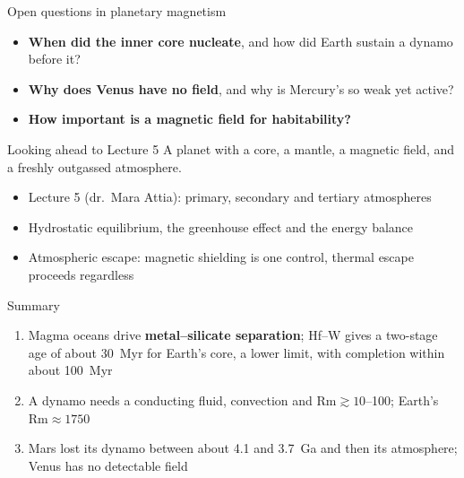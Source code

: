 \documentclass[aspectratio=169, 11pt]{beamer}
\begin{document}
\begin{frame}{Open questions in planetary magnetism}
  \begin{itemize}\setlength\itemsep{4pt}
    \item \textbf{When did the inner core nucleate}, and how did Earth sustain a dynamo before it?
    \item \textbf{Why does Venus have no field}, and why is Mercury's so weak yet active?
    \item \textbf{How important is a magnetic field for habitability?}
  \end{itemize}
\end{frame}

\begin{frame}{Looking ahead to Lecture 5}
  A planet with a core, a mantle, a magnetic field, and a freshly outgassed atmosphere.
  \vskip8pt
  \begin{itemize}\setlength\itemsep{3pt}
    \item Lecture 5 (dr.\ Mara Attia): primary, secondary and tertiary atmospheres
    \item Hydrostatic equilibrium, the greenhouse effect and the energy balance
    \item Atmospheric escape: magnetic shielding is one control, thermal escape proceeds regardless
  \end{itemize}
  \vskip8pt
\end{frame}

\begin{frame}{Summary}
  \begin{enumerate}\setlength\itemsep{6pt}
    \item Magma oceans drive \textbf{metal--silicate separation}; Hf--W gives a two-stage age of about 30~Myr for Earth's core, a lower limit, with completion within about 100~Myr
    \item A dynamo needs a conducting fluid, convection and $\mathrm{Rm} \gtrsim 10$--100; Earth's $\mathrm{Rm} \approx 1750$
    \item Mars lost its dynamo between about 4.1 and 3.7~Ga and then its atmosphere; Venus has no detectable field
  \end{enumerate}
\end{frame}
\end{document}
